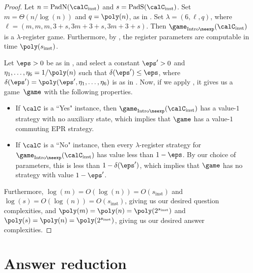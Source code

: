 \begin{proof}
Let $n = \mathrm{PadN}(\calC_{\mathrm{inst}})$ and $s = \mathrm{PadS}(\calC_{\mathrm{inst}})$.
Set $m = \Theta(n/\log(n))$ and $q = \poly(n)$,
as in .
Set $\lambda = (6, \ell, q)$,
where $\ell = (m, m, m, 3+s, 3m + 3 + s, 3m + 3 + s)$.
Then $\game_{\mathrm{Intro}\neexp}(\calC_{\mathrm{inst}})$
is a $\lambda$-register game.
Furthermore, by ,
the register parameters are computable in time $\poly(s_{\mathrm{inst}})$.

Let $\eps >0$ be as in , and select a constant $\eps' > 0$ and $\eta_1, \ldots, \eta_{6} = 1/\poly(n)$
such that $\delta(\eps') \leq \eps$, where $\delta(\eps') = \poly(\eps', \eta_1, \ldots, \eta_{6})$ is as in .
Now, if we apply , it gives us a game~$\game$ with the following properties.
\begin{itemize}
\item[$\circ$] If $\calC$ is a ``Yes" instance, then $\game_{\mathrm{Intro}\neexp}(\calC_{\mathrm{inst}})$ has a value-$1$ strategy with no auxiliary state, which implies that $\game$ has a value-$1$ commuting EPR strategy.
\item[$\circ$] If $\calC$ is a ``No" instance, then every $\lambda$-register strategy for
		$\game_{\mathrm{Intro}\neexp}(\calC_{\mathrm{inst}})$ has value less than $1-\eps$.
		By our choice of parameters, this is less than $1-\delta(\eps')$, which implies that $\game$ has no strategy with value $1-\eps'$.
\end{itemize}
Furthermore, $\log(m) = O(\log(n)) = O(s_{\mathrm{inst}})$ and $\log(s) = O(\log(n)) = O(s_{\mathrm{inst}})$, giving us our desired question complexities,
and $\poly(m) = \poly(n) = \poly(2^{s_{\mathrm{inst}}})$ and $\poly(s) = \poly(n) = \poly(2^{s_\mathrm{inst}})$, giving us our desired answer complexities.
\end{proof}


\part{Answer reduction}

\label{part:answer}


